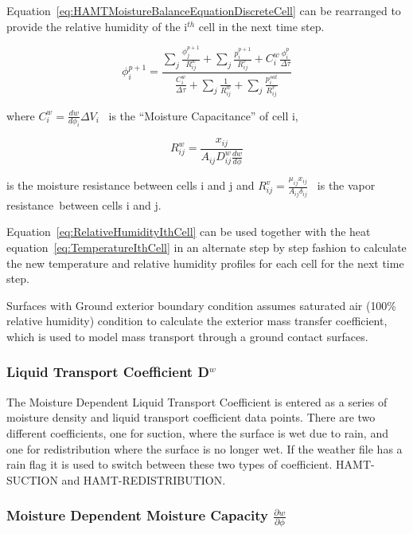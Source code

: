 Equation~\ref{eq:HAMTMoistureBalanceEquationDiscreteCell} can be rearranged to provide the relative humidity of the i\(^{th}\) cell in the next time step.

\begin{equation}
\phi_i^{p + 1} = \frac{{\sum\nolimits_j {\frac{{\phi_j^{p + 1}}}{{R_{ij}^w}}}  + \sum\nolimits_j {\frac{{p_i^{p + 1}}}{{R_{ij}^v}}}  + C_i^w\frac{{\phi_i^p}}{{\Delta \tau }}}}{{\frac{{C_i^w}}{{\Delta \tau }} + \sum\nolimits_j {\frac{1}{{R_{ij}^w}} + \sum\nolimits_j {\frac{{p_i^{sat}}}{{R_{ij}^v}}} } }}
\label{eq:RelativeHumidityIthCell}
\end{equation}

where \(C_i^w = \frac{dw}{d\phi_{i}}\Delta {V_i}\) ~is the ``Moisture Capacitance'' of cell i,

\begin{equation}
R_{ij}^w = \frac{{{x_{ij}}}}{{{A_{ij}}D_{ij}^w\frac{{dw}}{{d\phi }}}}
\end{equation}

is the moisture resistance between cells i and j and \(R_{ij}^v = \frac{\mu_{ij}x_{ij}}{A_{ij}\delta_{ij}}\) ~is the vapor resistance~between cells i and j.

Equation~\ref{eq:RelativeHumidityIthCell} can be used together with the heat equation~\ref{eq:TemperatureIthCell} in an alternate step by step fashion to calculate the new temperature and relative humidity profiles for each cell for the next time step.

Surfaces with Ground exterior boundary condition assumes saturated air ({100\%} relative humidity) condition to calculate the exterior mass transfer coefficient, which is used to model mass transport through a ground contact surfaces.

\subsubsection{Liquid Transport Coefficient D\(^{w}\)}\label{liquid-transport-coefficient-dw}

The Moisture Dependent Liquid Transport Coefficient is entered as a series of moisture density and liquid transport coefficient data points. There are two different coefficients, one for suction, where the surface is wet due to rain, and one for redistribution where the surface is no longer wet. If the weather file has a rain flag it is used to switch between these two types of coefficient. HAMT-SUCTION and HAMT-REDISTRIBUTION.

\subsubsection{Moisture Dependent Moisture Capacity \(\frac{\partial w}{\partial \phi}\)}\label{moisture-dependent-moisture-capacity-fracpartial-wpartial-phi}

